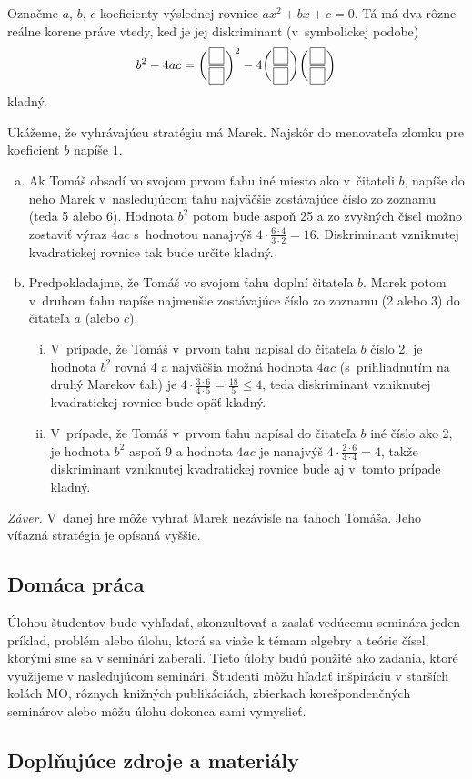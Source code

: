 \rieh Označme $a$, $b$, $c$ koeficienty výslednej rovnice $ax^2 + bx + c = 0$. Tá má dva rôzne reálne korene práve vtedy, keď je jej diskriminant (v~symbolickej podobe)
$$b^2 - 4ac =\bigg( \frac{{\fbox{$\phantom{7}$}}}{{\fbox{$\phantom{7}$}}} \bigg)^2-4\bigg( \frac{{\fbox{$\phantom{7}$}}}{{\fbox{$\phantom{7}$}}}\bigg) \bigg(\frac{{\fbox{$\phantom{7}$}}}{{\fbox{$\phantom{7}$}}}\bigg)$$
kladný.

Ukážeme, že vyhrávajúcu stratégiu má Marek. Najskôr do menovateľa zlomku pre koeficient $b$ napíše $1$.
\begin{enumerate}[a)]
\item Ak Tomáš obsadí vo svojom prvom ťahu iné miesto ako v~čitateli $b$, napíše do neho Marek v~nasledujúcom ťahu najväčšie zostávajúce číslo zo zoznamu (teda 5 alebo 6). Hodnota $b^2$ potom bude aspoň 25 a zo zvyšných čísel možno zostaviť výraz $4ac$ s~hodnotou nanajvýš $4\cdot  \frac{6\cdot4}{3\cdot2}= 16$. Diskriminant vzniknutej kvadratickej rovnice tak bude určite kladný.
\item Predpokladajme, že Tomáš vo svojom ťahu doplní čitateľa $b$. Marek potom v~druhom ťahu napíše najmenšie zostávajúce číslo zo zoznamu (2 alebo 3) do čitateľa $a$ (alebo $c$).
\begin{enumerate}[(i)]
\item V~prípade, že Tomáš v~prvom ťahu napísal do čitateľa $b$ číslo 2, je hodnota $b^2$ rovná 4 a najväčšia možná hodnota $4ac$ (s~prihliadnutím na druhý Marekov ťah) je $4 \cdot \frac{3\cdot 6}{4\cdot 5}=\frac{18}{5}\leq  4$, teda diskriminant vzniknutej kvadratickej rovnice bude opäť kladný.
\item  V~prípade, že Tomáš v~prvom ťahu napísal do čitateľa $b$ iné číslo ako 2, je hodnota $b^2$ aspoň 9 a hodnota $4ac$ je nanajvýš $4 \cdot \frac{2\cdot 6}{3\cdot4} = 4$, takže diskriminant
vzniknutej kvadratickej rovnice bude aj v~tomto prípade kladný.

\end{enumerate}
\end{enumerate}
\textit{Záver.} V~danej hre môže vyhrať Marek nezávisle na ťahoch Tomáša. Jeho víťazná stratégia je opísaná vyššie.


\subsection*{Domáca práca}
Úlohou študentov bude vyhľadať, skonzultovať a zaslať vedúcemu seminára jeden príklad, problém alebo úlohu, ktorá sa viaže k témam algebry a teórie čísel, ktorými sme sa v seminári zaberali. Tieto úlohy budú použité ako zadania, ktoré využijeme v nasledujúcom seminári. Študenti môžu hľadať inšpiráciu v starších kolách MO, rôznych knižných publikáciách, zbierkach korešpondenčných seminárov alebo môžu úlohu dokonca sami vymyslieť.

\subsection*{Doplňujúce zdroje a materiály}



